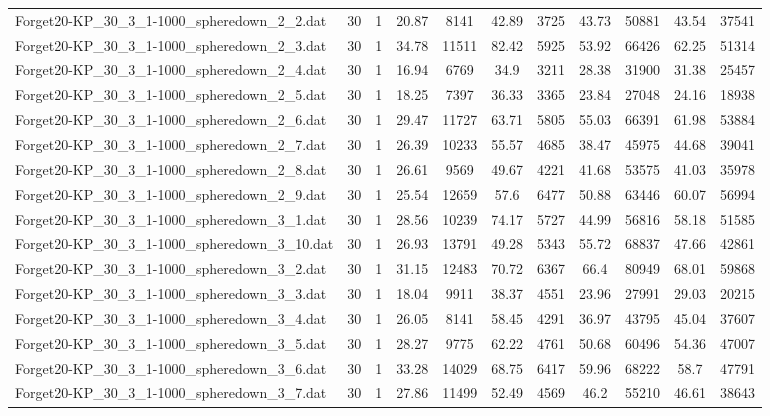 \begin{table}[!ht]
\begin{tabular}{lcccccccccc}
Forget20-KP\_30\_3\_1-1000\_spheredown\_2\_2.dat & 30 & 1 & 20.87 & 8141 & 42.89 & 3725 & 43.73 & 50881 & 43.54 & 37541 \\
Forget20-KP\_30\_3\_1-1000\_spheredown\_2\_3.dat & 30 & 1 & 34.78 & 11511 & 82.42 & 5925 & 53.92 & 66426 & 62.25 & 51314 \\
Forget20-KP\_30\_3\_1-1000\_spheredown\_2\_4.dat & 30 & 1 & 16.94 & 6769 & 34.9 & 3211 & 28.38 & 31900 & 31.38 & 25457 \\
Forget20-KP\_30\_3\_1-1000\_spheredown\_2\_5.dat & 30 & 1 & 18.25 & 7397 & 36.33 & 3365 & 23.84 & 27048 & 24.16 & 18938 \\
Forget20-KP\_30\_3\_1-1000\_spheredown\_2\_6.dat & 30 & 1 & 29.47 & 11727 & 63.71 & 5805 & 55.03 & 66391 & 61.98 & 53884 \\
Forget20-KP\_30\_3\_1-1000\_spheredown\_2\_7.dat & 30 & 1 & 26.39 & 10233 & 55.57 & 4685 & 38.47 & 45975 & 44.68 & 39041 \\
Forget20-KP\_30\_3\_1-1000\_spheredown\_2\_8.dat & 30 & 1 & 26.61 & 9569 & 49.67 & 4221 & 41.68 & 53575 & 41.03 & 35978 \\
Forget20-KP\_30\_3\_1-1000\_spheredown\_2\_9.dat & 30 & 1 & 25.54 & 12659 & 57.6 & 6477 & 50.88 & 63446 & 60.07 & 56994 \\
Forget20-KP\_30\_3\_1-1000\_spheredown\_3\_1.dat & 30 & 1 & 28.56 & 10239 & 74.17 & 5727 & 44.99 & 56816 & 58.18 & 51585 \\
Forget20-KP\_30\_3\_1-1000\_spheredown\_3\_10.dat & 30 & 1 & 26.93 & 13791 & 49.28 & 5343 & 55.72 & 68837 & 47.66 & 42861 \\
Forget20-KP\_30\_3\_1-1000\_spheredown\_3\_2.dat & 30 & 1 & 31.15 & 12483 & 70.72 & 6367 & 66.4 & 80949 & 68.01 & 59868 \\
Forget20-KP\_30\_3\_1-1000\_spheredown\_3\_3.dat & 30 & 1 & 18.04 & 9911 & 38.37 & 4551 & 23.96 & 27991 & 29.03 & 20215 \\
Forget20-KP\_30\_3\_1-1000\_spheredown\_3\_4.dat & 30 & 1 & 26.05 & 8141 & 58.45 & 4291 & 36.97 & 43795 & 45.04 & 37607 \\
Forget20-KP\_30\_3\_1-1000\_spheredown\_3\_5.dat & 30 & 1 & 28.27 & 9775 & 62.22 & 4761 & 50.68 & 60496 & 54.36 & 47007 \\
Forget20-KP\_30\_3\_1-1000\_spheredown\_3\_6.dat & 30 & 1 & 33.28 & 14029 & 68.75 & 6417 & 59.96 & 68222 & 58.7 & 47791 \\
Forget20-KP\_30\_3\_1-1000\_spheredown\_3\_7.dat & 30 & 1 & 27.86 & 11499 & 52.49 & 4569 & 46.2 & 55210 & 46.61 & 38643 \\

\end{tabular}
\end{table}

